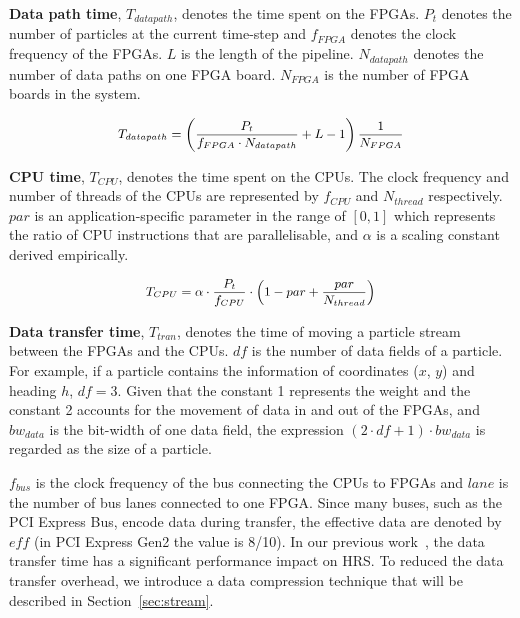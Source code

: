 \textbf{Data path time}, $T_{datapath}$, denotes the time spent on the FPGAs.
$P_t$ denotes the number of particles at the current time-step and $f_{FPGA}$ denotes the clock frequency of the FPGAs.
$L$ is the length of the pipeline.
$N_{datapath}$ denotes the number of data paths on one FPGA board.
$N_{FPGA}$ is the number of FPGA boards in the system.

\begin{equation}
\small
\begin{aligned}
T_{datapath} = \left(\frac{P_t}{f_{FPGA} \cdot N_{datapath}} + L - 1 \right) \frac{1}{N_{FPGA}}
\end{aligned}
\label{eqt:kernel}
\end{equation}

\textbf{CPU time}, $T_{CPU}$, denotes the time spent on the CPUs.
The clock frequency and number of threads of the CPUs are represented by $f_{CPU}$ and $N_{thread}$ respectively.
$par$ is an application-specific parameter in the range of $[0,1]$ which represents the ratio of CPU instructions that are parallelisable, and $\alpha$ is a scaling constant derived empirically.

\begin{equation}
\small
\begin{aligned}
T_{CPU} = \alpha \cdot \frac{P_t}{f_{CPU}} \cdot \left(1-par+\frac{par}{N_{thread}}\right)
\end{aligned}
\label{eqt:host}
\end{equation}

\textbf{Data transfer time}, $T_{tran}$, denotes the time of moving a particle stream between the FPGAs and the CPUs.
$df$ is the number of data fields of a particle.
For example, if a particle contains the information of coordinates ($x$, $y$) and heading $h$, $df=3$.
Given that the constant 1 represents the weight and the constant 2 accounts for the movement of data in and out of the FPGAs,
and $bw_{data}$ is the bit-width of one data field, the expression $(2 \cdot df + 1) \cdot bw_{data}$ is regarded as the size of a particle.

$f_{bus}$ is the clock frequency of the bus connecting the CPUs to FPGAs and $lane$ is the number of bus lanes connected to one FPGA.
Since many buses, such as the PCI Express Bus, encode data during transfer, the effective data are denoted by $eff$ (in PCI Express Gen2 the value is 8/10).
In our previous work~\cite{chau13a}, the data transfer time has a significant performance impact on HRS.
To reduced the data transfer overhead, we introduce a data compression technique that will be described in Section~\ref{sec:stream}.

